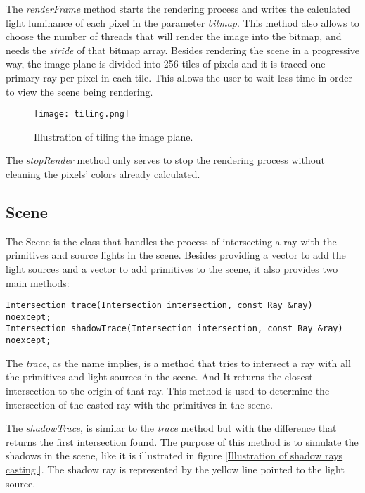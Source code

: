 \par
The \textit{renderFrame} method starts the rendering process and writes the calculated light luminance of each pixel in the parameter \textit{bitmap}.
This method also allows to choose the number of threads that will render the image into the bitmap, and needs the \textit{stride} of that bitmap array.
Besides rendering the scene in a progressive way, the image plane is divided into 256 tiles of pixels and it is traced one primary ray per pixel in each tile.
This allows the user to wait less time in order to view the scene being rendering.

\begin{figure}[H]
	\centering
	\caption{Illustration of tiling the image plane.}
	\label{Illustration of tiling the image plane.}
	\texttt{[image: tiling.png]}
\end{figure}

\par
The \textit{stopRender} method only serves to stop the rendering process without cleaning the pixels' colors already calculated.

\subsection{Scene}

\par
The Scene is the class that handles the process of intersecting a ray with the primitives and source lights in the scene.
Besides providing a vector to add the light sources and a vector to add primitives to the scene, it also provides two main methods:

\begin{lstlisting}[caption={Main methods in Scene}, captionpos=b, label=Scene]
Intersection trace(Intersection intersection, const Ray &ray) noexcept;
Intersection shadowTrace(Intersection intersection, const Ray &ray) noexcept;
\end{lstlisting}

\par
The \textit{trace}, as the name implies, is a method that tries to intersect a ray with all the primitives and light sources in the scene.
And It returns the closest intersection to the origin of that ray.
This method is used to determine the intersection of the casted ray with the primitives in the scene.

\par
The \textit{shadowTrace}, is similar to the \textit{trace} method but with the difference that returns the first intersection found.
The purpose of this method is to simulate the shadows in the scene, like it is illustrated in figure \ref{Illustration of shadow rays casting.}.
The shadow ray is represented by the yellow line pointed to the light source.

